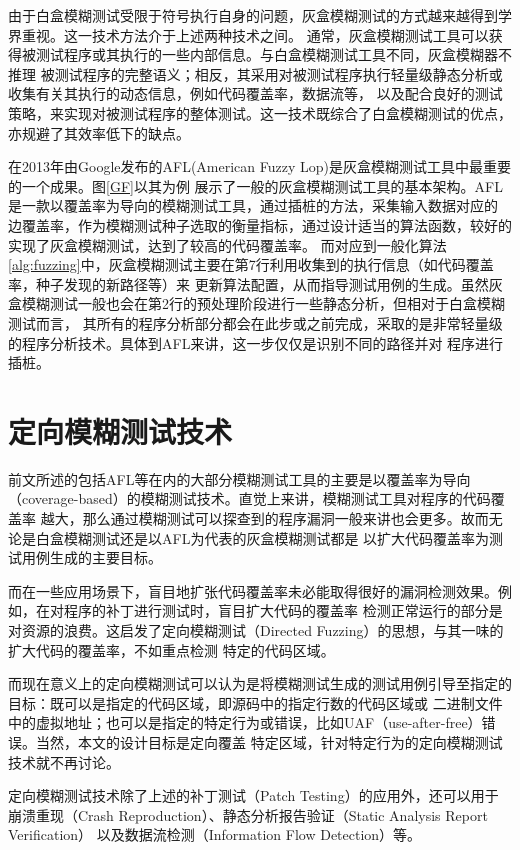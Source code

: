 \documentclass[bachelor]{njupthesis}
\begin{document}
由于白盒模糊测试受限于符号执行自身的问题，灰盒模糊测试的方式越来越得到学界重视。这一技术方法介于上述两种技术之间。
通常，灰盒模糊测试工具可以获得被测试程序或其执行的一些内部信息。与白盒模糊测试工具不同，灰盒模糊器不推理
被测试程序的完整语义；相反，其采用对被测试程序执行轻量级静态分析或收集有关其执行的动态信息，例如代码覆盖率，数据流等，
以及配合良好的测试策略，来实现对被测试程序的整体测试。这一技术既综合了白盒模糊测试的优点，亦规避了其效率低下的缺点。

在2013年由Google发布的AFL\cite{AFL}(American Fuzzy Lop)是灰盒模糊测试工具中最重要的一个成果。图\ref{GF}以其为例
展示了一般的灰盒模糊测试工具的基本架构。AFL是一款以覆盖率为导向的模糊测试工具，通过插桩的方法，采集输入数据对应的
边覆盖率，作为模糊测试种子选取的衡量指标，通过设计适当的算法函数，较好的实现了灰盒模糊测试，达到了较高的代码覆盖率。
而对应到一般化算法\ref{alg:fuzzing}中，灰盒模糊测试主要在第7行利用收集到的执行信息（如代码覆盖率，种子发现的新路径等）来
更新算法配置，从而指导测试用例的生成。虽然灰盒模糊测试一般也会在第2行的预处理阶段进行一些静态分析，但相对于白盒模糊测试而言，
其所有的程序分析部分都会在此步或之前完成，采取的是非常轻量级的程序分析技术。具体到AFL来讲，这一步仅仅是识别不同的路径并对
程序进行插桩。

\section{定向模糊测试技术}
前文所述的包括AFL等在内的大部分模糊测试工具的主要是以覆盖率为导向（coverage-based）的模糊测试技术。直觉上来讲，模糊测试工具对程序的代码覆盖率
越大，那么通过模糊测试可以探查到的程序漏洞一般来讲也会更多。故而无论是白盒模糊测试还是以AFL为代表的灰盒模糊测试都是
以扩大代码覆盖率为测试用例生成的主要目标。

而在一些应用场景下，盲目地扩张代码覆盖率未必能取得很好的漏洞检测效果。例如，在对程序的补丁进行测试时，盲目扩大代码的覆盖率
检测正常运行的部分是对资源的浪费。这启发了定向模糊测试（Directed Fuzzing）的思想，与其一味的扩大代码的覆盖率，不如重点检测
特定的代码区域。

而现在意义上的定向模糊测试可以认为是将模糊测试生成的测试用例引导至指定的目标：既可以是指定的代码区域，即源码中的指定行数的代码区域或
二进制文件中的虚拟地址；也可以是指定的特定行为或错误，比如UAF（use-after-free）错误。当然，本文的设计目标是定向覆盖
特定区域，针对特定行为的定向模糊测试技术就不再讨论。

定向模糊测试技术除了上述的补丁测试（Patch Testing）的应用外，还可以用于崩溃重现（Crash Reproduction）、静态分析报告验证（Static Analysis Report Verification）
以及数据流检测（Information Flow Detection）等。
\end{document}
